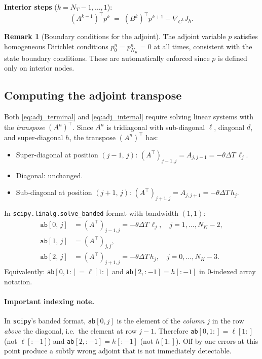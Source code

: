 \documentclass[11pt, a4paper]{article}
\newcommand{\dT}{\Delta T}
\theoremstyle{definition}
\newtheorem{remark}{Remark}[section]
\theoremstyle{plain}
\begin{document}
\medskip
\textbf{Interior steps} ($k = N_T - 1, \ldots, 1$):
\begin{equation}\label{eq:adj_internal}
  (A^{k-1})^\top p^k
  \;=\; (B^k)^\top p^{k+1} - \nabla_{C^k} J_h.
\end{equation}

\begin{remark}[Boundary conditions for the adjoint]
The adjoint variable $p$ satisfies homogeneous Dirichlet conditions
$p_0^n = p_{N_K}^n = 0$ at all times, consistent with the state boundary
conditions. These are automatically enforced since $p$ is defined only on
interior nodes.
\end{remark}

\subsection{Computing the adjoint transpose}

Both \eqref{eq:adj_terminal} and \eqref{eq:adj_internal} require solving
linear systems with the \emph{transpose} $(A^n)^\top$. Since $A^n$ is
tridiagonal with sub-diagonal $\ell$, diagonal $d$, and super-diagonal $h$,
the transpose $(A^n)^\top$ has:
\begin{itemize}
  \item Super-diagonal at position $(j-1,\,j)$: $(A^\top)_{j-1,j} = A_{j,j-1} = -\theta\dT\,\ell_j$.
  \item Diagonal: unchanged.
  \item Sub-diagonal at position $(j+1,\,j)$: $(A^\top)_{j+1,j} = A_{j,j+1} = -\theta\dT\,h_j$.
\end{itemize}
In \texttt{scipy.linalg.solve\_banded} format with bandwidth $(1,1)$:
\begin{equation}\label{eq:AT_banded}
\begin{split}
  \texttt{ab}[0,\,j] &= (A^\top)_{j-1,j} = -\theta\dT\,\ell_j,
    \quad j = 1, \ldots, N_K-2,\\
  \texttt{ab}[1,\,j] &= (A^\top)_{j,j}, \\
  \texttt{ab}[2,\,j] &= (A^\top)_{j+1,j} = -\theta\dT\,h_j,
    \quad j = 0, \ldots, N_K-3.
\end{split}
\end{equation}
Equivalently: \texttt{ab}$[0, 1:] = \ell[1:]$ and
\texttt{ab}$[2, :-1] = h[:-1]$ in 0-indexed array notation.

\paragraph{Important indexing note.}
In \texttt{scipy}'s banded format, \texttt{ab}$[0,j]$ is the element of the
\emph{column} $j$ in the row \emph{above} the diagonal, i.e.\ the element
at row $j-1$. Therefore \texttt{ab}$[0, 1:] = \ell[1:]$ (not $\ell[:-1]$)
and \texttt{ab}$[2, :-1] = h[:-1]$ (not $h[1:]$). Off-by-one errors at this
point produce a subtly wrong adjoint that is not immediately detectable.
\end{document}
